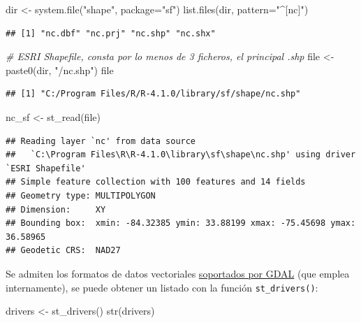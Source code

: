 \documentclass[
  spanish,
]{book}
\newenvironment{Shaded}{\begin{snugshade}}{\end{snugshade}}
\newcommand{\AttributeTok}[1]{\textcolor[rgb]{0.77,0.63,0.00}{#1}}
\newcommand{\CommentTok}[1]{\textcolor[rgb]{0.56,0.35,0.01}{\textit{#1}}}
\newcommand{\FunctionTok}[1]{\textcolor[rgb]{0.00,0.00,0.00}{#1}}
\newcommand{\NormalTok}[1]{#1}
\newcommand{\OtherTok}[1]{\textcolor[rgb]{0.56,0.35,0.01}{#1}}
\newcommand{\StringTok}[1]{\textcolor[rgb]{0.31,0.60,0.02}{#1}}
\theoremstyle{break}
\begin{document}
\begin{Shaded}
\begin{Highlighting}[]
\NormalTok{dir }\OtherTok{\textless{}{-}} \FunctionTok{system.file}\NormalTok{(}\StringTok{"shape"}\NormalTok{, }\AttributeTok{package=}\StringTok{"sf"}\NormalTok{)}
\FunctionTok{list.files}\NormalTok{(dir, }\AttributeTok{pattern=}\StringTok{"\^{}[nc]"}\NormalTok{)}
\end{Highlighting}
\end{Shaded}

\begin{verbatim}
## [1] "nc.dbf" "nc.prj" "nc.shp" "nc.shx"
\end{verbatim}

\begin{Shaded}
\begin{Highlighting}[]
\CommentTok{\# ESRI Shapefile, consta por lo menos de 3 ficheros, el principal .shp}
\NormalTok{file }\OtherTok{\textless{}{-}} \FunctionTok{paste0}\NormalTok{(dir, }\StringTok{"/nc.shp"}\NormalTok{)}
\NormalTok{file}
\end{Highlighting}
\end{Shaded}

\begin{verbatim}
## [1] "C:/Program Files/R/R-4.1.0/library/sf/shape/nc.shp"
\end{verbatim}

\begin{Shaded}
\begin{Highlighting}[]
\NormalTok{nc\_sf }\OtherTok{\textless{}{-}} \FunctionTok{st\_read}\NormalTok{(file)}
\end{Highlighting}
\end{Shaded}

\begin{verbatim}
## Reading layer `nc' from data source 
##   `C:\Program Files\R\R-4.1.0\library\sf\shape\nc.shp' using driver `ESRI Shapefile'
## Simple feature collection with 100 features and 14 fields
## Geometry type: MULTIPOLYGON
## Dimension:     XY
## Bounding box:  xmin: -84.32385 ymin: 33.88199 xmax: -75.45698 ymax: 36.58965
## Geodetic CRS:  NAD27
\end{verbatim}

Se admiten los formatos de datos vectoriales \href{https://gdal.org/drivers/vector/index.html}{soportados por GDAL} (que emplea internamente),
se puede obtener un listado con la función \texttt{st\_drivers()}:

\begin{Shaded}
\begin{Highlighting}[]
\NormalTok{drivers }\OtherTok{\textless{}{-}} \FunctionTok{st\_drivers}\NormalTok{()}
\FunctionTok{str}\NormalTok{(drivers)}
\end{Highlighting}
\end{Shaded}
\end{document}
